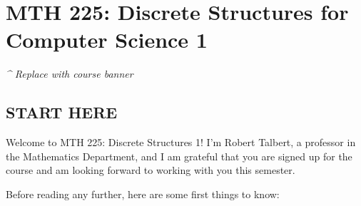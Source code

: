 \documentclass[]{article}
\date{}
\begin{document}
\hypertarget{mth-225-discrete-structures-for-computer-science-1}{%
\section{MTH 225: Discrete Structures for Computer Science
1}\label{mth-225-discrete-structures-for-computer-science-1}}

\emph{\^{} Replace with course banner}

\hypertarget{start-here}{%
\subsection{START HERE}\label{start-here}}

Welcome to MTH 225: Discrete Structures 1! I'm Robert Talbert, a
professor in the Mathematics Department, and I am grateful that you are
signed up for the course and am looking forward to working with you this
semester.

Before reading any further, here are some first things to know:
\end{document}
